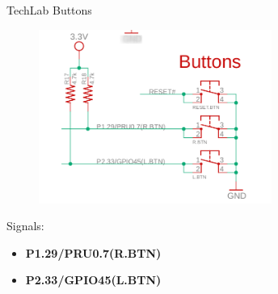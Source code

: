 \begin{frame}
	{TechLab Buttons}
	     \begin{figure}[H]
		     \includegraphics[width=3in]{IMAGES/techlab-buttons}
	     \end{figure}
		Signals:
	        \begin{itemize}
		\item
			\textbf{P1.29/PRU0.7(R.BTN)}
		\item
			\textbf{P2.33/GPIO45(L.BTN)}
	        \end{itemize}
\end{frame}
\cprotect\note{


}

